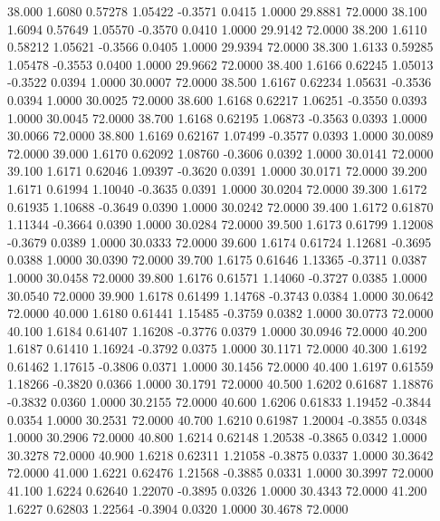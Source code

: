   38.000   1.6080   0.57278   1.05422  -0.3571   0.0415   1.0000  29.8881  72.0000
  38.100   1.6094   0.57649   1.05570  -0.3570   0.0410   1.0000  29.9142  72.0000
  38.200   1.6110   0.58212   1.05621  -0.3566   0.0405   1.0000  29.9394  72.0000
  38.300   1.6133   0.59285   1.05478  -0.3553   0.0400   1.0000  29.9662  72.0000
  38.400   1.6166   0.62245   1.05013  -0.3522   0.0394   1.0000  30.0007  72.0000
  38.500   1.6167   0.62234   1.05631  -0.3536   0.0394   1.0000  30.0025  72.0000
  38.600   1.6168   0.62217   1.06251  -0.3550   0.0393   1.0000  30.0045  72.0000
  38.700   1.6168   0.62195   1.06873  -0.3563   0.0393   1.0000  30.0066  72.0000
  38.800   1.6169   0.62167   1.07499  -0.3577   0.0393   1.0000  30.0089  72.0000
  39.000   1.6170   0.62092   1.08760  -0.3606   0.0392   1.0000  30.0141  72.0000
  39.100   1.6171   0.62046   1.09397  -0.3620   0.0391   1.0000  30.0171  72.0000
  39.200   1.6171   0.61994   1.10040  -0.3635   0.0391   1.0000  30.0204  72.0000
  39.300   1.6172   0.61935   1.10688  -0.3649   0.0390   1.0000  30.0242  72.0000
  39.400   1.6172   0.61870   1.11344  -0.3664   0.0390   1.0000  30.0284  72.0000
  39.500   1.6173   0.61799   1.12008  -0.3679   0.0389   1.0000  30.0333  72.0000
  39.600   1.6174   0.61724   1.12681  -0.3695   0.0388   1.0000  30.0390  72.0000
  39.700   1.6175   0.61646   1.13365  -0.3711   0.0387   1.0000  30.0458  72.0000
  39.800   1.6176   0.61571   1.14060  -0.3727   0.0385   1.0000  30.0540  72.0000
  39.900   1.6178   0.61499   1.14768  -0.3743   0.0384   1.0000  30.0642  72.0000
  40.000   1.6180   0.61441   1.15485  -0.3759   0.0382   1.0000  30.0773  72.0000
  40.100   1.6184   0.61407   1.16208  -0.3776   0.0379   1.0000  30.0946  72.0000
  40.200   1.6187   0.61410   1.16924  -0.3792   0.0375   1.0000  30.1171  72.0000
  40.300   1.6192   0.61462   1.17615  -0.3806   0.0371   1.0000  30.1456  72.0000
  40.400   1.6197   0.61559   1.18266  -0.3820   0.0366   1.0000  30.1791  72.0000
  40.500   1.6202   0.61687   1.18876  -0.3832   0.0360   1.0000  30.2155  72.0000
  40.600   1.6206   0.61833   1.19452  -0.3844   0.0354   1.0000  30.2531  72.0000
  40.700   1.6210   0.61987   1.20004  -0.3855   0.0348   1.0000  30.2906  72.0000
  40.800   1.6214   0.62148   1.20538  -0.3865   0.0342   1.0000  30.3278  72.0000
  40.900   1.6218   0.62311   1.21058  -0.3875   0.0337   1.0000  30.3642  72.0000
  41.000   1.6221   0.62476   1.21568  -0.3885   0.0331   1.0000  30.3997  72.0000
  41.100   1.6224   0.62640   1.22070  -0.3895   0.0326   1.0000  30.4343  72.0000
  41.200   1.6227   0.62803   1.22564  -0.3904   0.0320   1.0000  30.4678  72.0000

